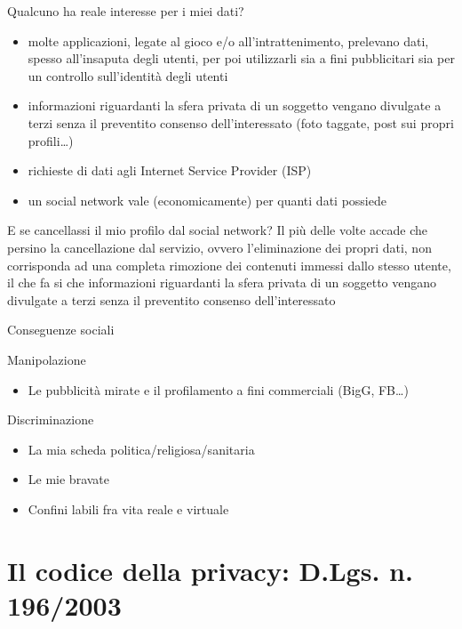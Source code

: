 \documentclass[italian]{beamer}
\begin{document}
\begin{frame}{Qualcuno ha reale interesse per i miei dati?}
	\begin{itemize}
		\item molte applicazioni, legate al gioco e/o all'intrattenimento, prelevano dati, spesso all'insaputa degli utenti, per poi utilizzarli sia a fini pubblicitari sia per un controllo sull'identità degli utenti
		\item informazioni riguardanti la sfera privata di un soggetto vengano divulgate a terzi senza il preventito consenso dell’interessato (foto taggate, post sui propri profili\ldots)
		\item richieste di dati agli Internet Service Provider (ISP)
		\item un social network vale (economicamente) per quanti dati possiede
	\end{itemize}
\end{frame}

\begin{frame}{E se cancellassi il mio profilo dal social network?}
	Il più delle volte accade che persino la cancellazione dal servizio, ovvero l'eliminazione dei propri dati, non corrisponda ad una completa rimozione dei contenuti immessi dallo stesso utente, il che fa si che informazioni riguardanti la sfera privata di un soggetto vengano divulgate a terzi senza il preventito consenso dell'interessato
\end{frame}

\begin{frame}{Conseguenze sociali}
	\begin{block}{Manipolazione}
		\begin{itemize}
			\item Le pubblicit\`a mirate e il profilamento a fini commerciali (BigG, FB\ldots)
		\end{itemize}
	\end{block}
	\begin{block}{Discriminazione}
		\begin{itemize}
			\item La mia scheda politica/religiosa/sanitaria
			\item Le mie bravate
			\item Confini labili fra vita reale e virtuale
		\end{itemize}
	\end{block}
\end{frame}

\section{Il codice della privacy: D.Lgs. n. 196/2003}
\end{document}
